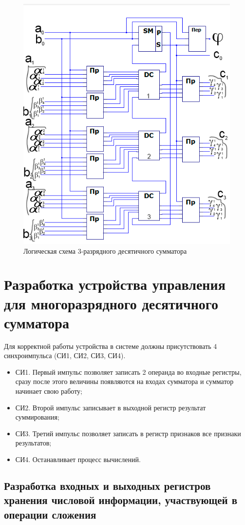 \documentclass[a4paper,14pt]{article}
\begin{document}
\begin{figure}[H]
	\centering
	\includegraphics[width=0.6\linewidth]{images/3razrSum}
	\caption{Логическая схема 3-разрядного десятичного сумматора}
	\label{fig:3razrSum}
\end{figure}



\section{Разработка устройства управления для многоразрядного десятичного сумматора}

Для корректной работы устройства в системе должны присутствовать 4 синхроимпульса (СИ1, СИ2, СИ3, СИ4).

\begin{itemize}
	\item СИ1. Первый импульс позволяет записать 2 операнда во входные регистры, сразу после этого величины появляются на входах сумматора и сумматор начинает свою работу;
	
	\item СИ2. Второй импульс записывает в выходной регистр результат суммирования;
	
	\item СИ3. Третий импульс позволяет записать в регистр признаков все признаки результатов;
	
	\item СИ4. Останавливает процесс вычислений.
\end{itemize} 

\subsection{Разработка входных и выходных регистров хранения числовой информации, участвующей в операции сложения}
\end{document}
